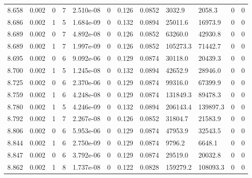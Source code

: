 \documentclass[preview]{standalone}
\begin{document}
{{{{{{{{{{\begin{tabular}{L{1.2cm}C{1.2cm} C{0.3cm}C{0.5cm} C{1.4cm}C{1.4cm} C{1.4cm}C{1.4cm} C{1.6cm}C{1.6cm} C{1.6cm}C{1.6cm}}
  8.658  &  0.002  & 0     &  7 &  2.510e-08  & 0  &  0.126&   0.0852& 3032.9 & 2058.3   &  0 & 0  \\ 
  8.686  &  0.002  & 1     &  5 &  1.684e-09  & 0  &  0.132&   0.0894& 25011.6 & 16973.9   &  0 & 0  \\ 
  8.689  &  0.002  & 0     &  7 &  4.892e-08  & 0  &  0.126&   0.0852& 63260.0 & 42930.8   &  0 & 0  \\ 
  8.689  &  0.002  & 1     &  7 &  1.997e-09  & 0  &  0.126&   0.0852& 105273.3 & 71442.7   &  0 & 0  \\ 
  8.695  &  0.002  & 0     &  6 &  9.092e-06  & 0  &  0.129&   0.0874& 30118.0 & 20439.3   &  0 & 0  \\ 
  8.700  &  0.002  & 1     &  5 &  1.245e-08  & 0  &  0.132&   0.0894& 42652.9 & 28946.0   &  0 & 0  \\ 
  8.725  &  0.002  & 0     &  6 &  2.370e-06  & 0  &  0.129&   0.0874& 99316.0 & 67399.9   &  0 & 0  \\ 
  8.759  &  0.002  & 1     &  6 &  4.248e-08  & 0  &  0.129&   0.0874& 131849.3 & 89478.3   &  0 & 0  \\ 
  8.780  &  0.002  & 1     &  5 &  4.246e-09  & 0  &  0.132&   0.0894& 206143.4 & 139897.3   &  0 & 0  \\ 
  8.792  &  0.002  & 1     &  7 &  2.267e-08  & 0  &  0.126&   0.0852& 31804.7 & 21583.9   &  0 & 0  \\ 
  8.806  &  0.002  & 0     &  6 &  5.953e-06  & 0  &  0.129&   0.0874& 47953.9 & 32543.5   &  0 & 0  \\ 
  8.844  &  0.002  & 1     &  6 &  2.750e-09  & 0  &  0.129&   0.0874& 9796.2 & 6648.1   &  0 & 0  \\ 
  8.847  &  0.002  & 0     &  6 &  3.792e-06  & 0  &  0.129&   0.0874& 29519.0 & 20032.8   &  0 & 0  \\ 
  8.862  &  0.002  & 1     &  8 &  1.737e-08  & 0  &  0.122&   0.0828& 159279.2 & 108093.3   &  0 & 0  \\ 
\hline 
\end{tabular} 

}}}}}}}}}}
\end{document}
